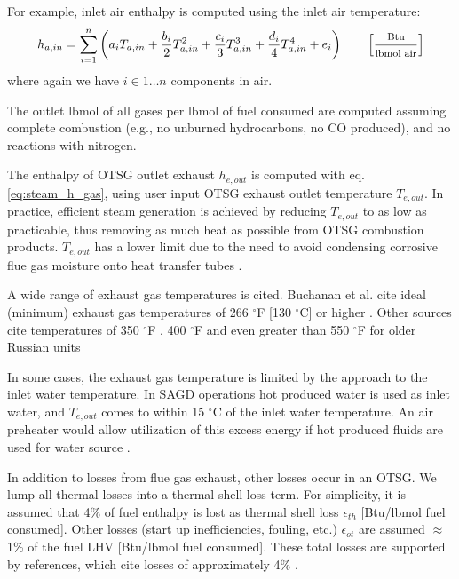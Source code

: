 \documentclass[11pt]{report}
\newcommand{\marg}[1]{{\footnotesize\textit{\textcolor{stanford}{'#1'}}}}
\newcommand{\marginnote}[1]{\marginpar{\marg{#1}}}
\begin{document}
For example, inlet air enthalpy is computed using the inlet air temperature:
\marginnote{Input Data \\ Table 4.1 - 4.6}
\begin{equation}\label{eq:steam_h_gas}
h_{a,in} = \sum_{i=1}^{n}\left( a_i T_{a,in} +\frac{b_i}{2}T_{a,in}^2 + \frac{c_i}{3}T_{a,in}^3 + \frac{d_i}{4}T_{a,in}^4 + e_i \right) \quad\quad \footnotesize{\left[\frac{\text{Btu}}{\text{lbmol air}}\right]} 
\end{equation}
where again we have $i \in 1 \ldots n$ components in air.

The outlet lbmol of \marginnote{Steam Generation 2.2.3} all gases per lbmol of fuel consumed are computed assuming complete combustion (e.g., no unburned hydrocarbons, no CO produced), and no reactions with nitrogen. 

The enthalpy of OTSG outlet exhaust $h_{e,out}$ is computed with eq.\ \marginnote{Steam Generation 2.5.1.4} \eqref{eq:steam_h_gas}, using user input OTSG exhaust outlet temperature $T_{e,out}$. In practice, efficient steam generation is achieved by reducing $T_{e,out}$ to as low as practicable, thus removing as much heat as possible from OTSG combustion products. $T_{e,out}$ has a lower limit due to the need to avoid condensing corrosive flue gas moisture onto heat transfer tubes \cite{Ganapathy2003}. 

A wide range of exhaust gas temperatures is cited. Buchanan et al. cite ideal (minimum) exhaust gas temperatures of 266 $^\circ$F [130 $^\circ$C] or higher \cite[p. 78]{Buchanan2009}. Other sources cite temperatures of 350 $^\circ$F \cite[p. 36]{Donaldson1989}, 400 $^\circ$F \cite[p. 227]{Chilingarian1987} and even greater than 550 $^\circ$F for older Russian units \cite[p. 181]{Baibakov1989} 

In some cases, the exhaust gas temperature is limited by the approach to the inlet water temperature. In SAGD operations hot produced water is used as inlet water, and $T_{e,out}$ comes to within 15 $^\circ$C of the inlet water temperature. An air preheater would allow utilization of this excess energy if hot produced fluids are used for water source \cite{Buchanan2009}.

In addition to \marginnote{Steam Generation 2.2.7.2} losses from flue gas exhaust, other losses occur in an OTSG. We lump all thermal losses into a thermal shell loss term. For simplicity, it is assumed that 4\% of fuel enthalpy is lost as thermal shell loss $\epsilon_{th}$ [Btu/lbmol fuel consumed]. Other losses (start up inefficiencies, fouling, etc.) $\epsilon_{ot}$ are assumed $\approx$1\% of the fuel LHV [Btu/lbmol fuel consumed]. These total losses are supported by references, which cite losses of approximately 4\% \cite{Ganapathy2003}.
\end{document}
